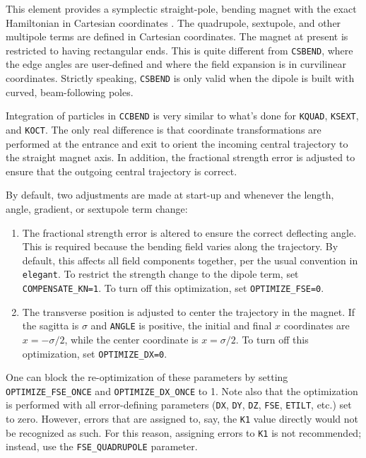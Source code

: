This element provides a symplectic straight-pole, bending magnet with the exact
Hamiltonian in Cartesian coordinates \cite{Borland-LS356}.
The quadrupole, sextupole, and other multipole terms are defined in Cartesian coordinates.
The magnet at present is restricted to having rectangular ends.
This is quite different from \verb|CSBEND|, where the edge angles are user-defined and
where the field expansion is in curvilinear coordinates.
Strictly speaking, \verb|CSBEND| is only valid when the dipole is built with curved,
beam-following poles.

Integration of particles in \verb|CCBEND| is very similar to what's done for
\verb|KQUAD|, \verb|KSEXT|, and \verb|KOCT|. 
The only real difference is that coordinate transformations are performed at the
entrance and exit to orient the incoming central trajectory to the straight magnet axis.
In addition, the fractional strength error is adjusted to ensure that the 
outgoing central trajectory is correct.

By default, two adjustments are made at start-up and whenever the length, angle, 
gradient, or sextupole term change:
\begin{enumerate}
\item The fractional strength error is altered to ensure the correct deflecting angle. 
      This is required because the bending field varies along the trajectory.
      By default, this affects all field 
      components together, per the usual convention in {\tt elegant}. To restrict
      the strength change to the dipole term, set \verb|COMPENSATE_KN=1|.
      To turn off this optimization, set \verb|OPTIMIZE_FSE=0|.
\item The transverse position is adjusted to center the trajectory in the magnet.
      If the sagitta is $\sigma$ and \verb|ANGLE| is positive, the initial and final $x$ 
      coordinates are $x=-\sigma/2$, while the center coordinate is $x=\sigma/2$.
      To turn off this optimization, set \verb|OPTIMIZE_DX=0|.
\end{enumerate}
One can block the re-optimization of these parameters by setting 
\verb|OPTIMIZE_FSE_ONCE| and \verb|OPTIMIZE_DX_ONCE| to 1.
Note also that the optimization is performed with all error-defining parameters
(\verb|DX|, \verb|DY|, \verb|DZ|, \verb|FSE|, \verb|ETILT|, etc.) set to zero.
However, errors that are assigned to, say, the \verb|K1| value directly would
not be recognized as such.
For this reason, assigning errors to \verb|K1| is not recommended; instead, use
the \verb|FSE_QUADRUPOLE| parameter.

